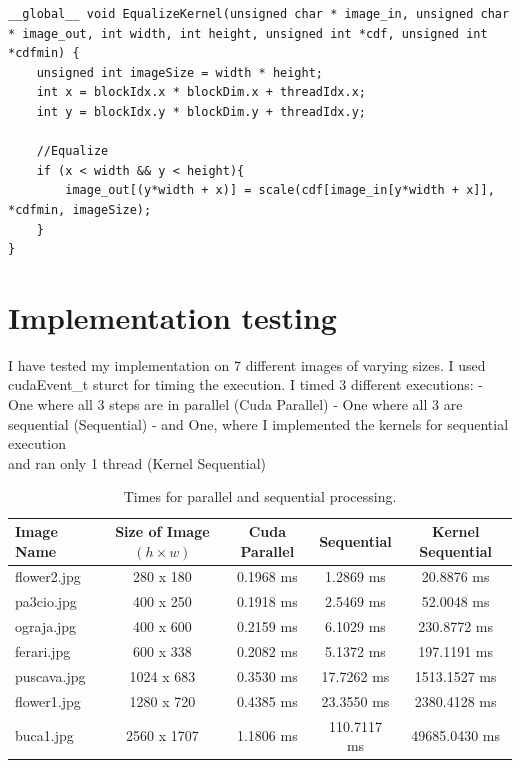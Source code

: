 \documentclass[10pt]{article}
\begin{document}
\begin{lstlisting}[style=cppstyle]
__global__ void EqualizeKernel(unsigned char * image_in, unsigned char * image_out, int width, int height, unsigned int *cdf, unsigned int *cdfmin) {
    unsigned int imageSize = width * height;
    int x = blockIdx.x * blockDim.x + threadIdx.x;
    int y = blockIdx.y * blockDim.y + threadIdx.y;
    
    //Equalize
    if (x < width && y < height){
        image_out[(y*width + x)] = scale(cdf[image_in[y*width + x]], *cdfmin, imageSize);
    }
}
\end{lstlisting}


\section{Implementation testing}

I have tested my implementation on 7 different images of varying sizes.
I used cudaEvent\_t sturct for timing the execution.
I timed 3 different executions:
- One where all 3 steps are in parallel (Cuda Parallel)
- One where all 3 are sequential (Sequential)
- and One, where I implemented the kernels for sequential execution\\
and ran only 1 thread (Kernel Sequential)

\begin{table}[ht]
\centering
\begin{tabular}{lcccc}
\toprule
\textbf{Image Name} & \textbf{Size of Image $(h \times w)$} & \textbf{Cuda Parallel} & \textbf{ Sequential} & \textbf{Kernel Sequential} \\
\midrule
flower2.jpg & 280 x 180 & 0.1968 ms & 1.2869 ms & 20.8876 ms \\
pa3cio.jpg & 400 x 250 & 0.1918 ms & 2.5469 ms & 52.0048 ms \\
ograja.jpg & 400 x 600 & 0.2159 ms & 6.1029 ms & 230.8772 ms \\
ferari.jpg & 600 x 338 & 0.2082 ms & 5.1372 ms & 197.1191 ms \\
puscava.jpg & 1024 x 683 & 0.3530 ms & 17.7262 ms & 1513.1527 ms \\
flower1.jpg & 1280 x 720 & 0.4385 ms & 23.3550 ms & 2380.4128 ms \\
buca1.jpg & 2560 x 1707 & 1.1806 ms & 110.7117 ms & 49685.0430 ms \\
\bottomrule
\end{tabular}
\caption{Times for parallel and sequential processing.}
\label{tab:processing_times}
\end{table}
\end{document}
